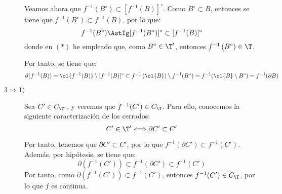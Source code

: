 \begin{ejercicio}
\begin{description}
    Veamos ahora que $f^{-1}(B^\circ)\subset [f^{-1}\left(B\right)]^\circ$. Como $B^\circ \subset B$, entonces se tiene que $f^{-1}(B^\circ)\subset f^{-1}\left(B\right)$, por lo que:
    \begin{equation*}
        f^{-1}(B^\circ) \AstIg [f^{-1}(B^\circ)]^\circ \subset [f^{-1}(B)]^\circ
    \end{equation*}
    donde en $(\ast)$ he empleado que, como $B^\circ \in {\T'}$, entonces $f^{-1}\left({B}^\circ \right)\in \T$.

    Por tanto, se tiene que:
    \begin{equation*}
        \partial (f^{-1}(B)) = \ol{f^{-1}(B)}\setminus [f^{-1}(B)]^\circ \subset f^{-1}\left(\ol{B}\right)\setminus f^{-1}(B^\circ) = f^{-1}(\ol{B}\setminus B^\circ) = f^{-1}(\partial B)
    \end{equation*}

    \item[$3 \Longrightarrow 1)$] Sea $C'\in C_{\T'}$, y veremos que $f^{-1}(C')\in C_{\T}$. Para ello, conocemos la siguiente caracterización de los cerrados:
    \begin{equation*}
        C'\in \T' \Longleftrightarrow \partial C'\subset C'
    \end{equation*}

    Por tanto, tenemos que $\partial C'\subset C'$, por lo que $f^{-1}(\partial C')\subset f^{-1}(C')$. Además, por hipótesis, se tiene que:
    \begin{equation*}
        \partial (f^{-1}(C')) \subset f^{-1}(\partial C') \subset f^{-1}(C')
    \end{equation*}
    Por tanto, como $\partial (f^{-1}(C'))\subset f^{-1}(C')$, entonces $f^{-1}(C')\in C_{\T}$, por lo que $f$ es continua.
\end{description}
\end{ejercicio}

